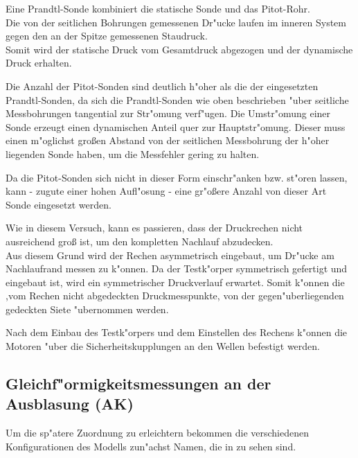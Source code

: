 Eine Prandtl-Sonde kombiniert die statische Sonde und das Pitot-Rohr.\\
Die von der seitlichen Bohrungen gemessenen Dr"ucke laufen im inneren System gegen den an der Spitze gemessenen Staudruck.\\
Somit wird der statische Druck vom Gesamtdruck abgezogen und der dynamische Druck erhalten.

Die Anzahl der Pitot-Sonden sind deutlich h"oher als die der eingesetzten Prandtl-Sonden, da sich die Prandtl-Sonden wie oben beschrieben "uber seitliche Messbohrungen tangential zur Str"omung verf"ugen. Die Umstr"omung einer Sonde erzeugt einen dynamischen Anteil quer zur Hauptstr"omung. Dieser muss einen m"oglichst gro\ss{}en Abstand von der seitlichen Messbohrung der h"oher liegenden Sonde haben, um die Messfehler gering zu halten.

Da die Pitot-Sonden sich nicht in dieser Form einschr"anken bzw. st"oren lassen, kann - zugute einer hohen Aufl"osung - eine gr"o\ss{}ere Anzahl von dieser Art Sonde eingesetzt werden.

Wie in diesem Versuch, kann es passieren, dass der Druckrechen nicht ausreichend gro\ss{} ist, um den kompletten Nachlauf abzudecken.\\
Aus diesem Grund wird der Rechen asymmetrisch eingebaut, um Dr"ucke am Nachlaufrand messen zu k"onnen. Da der Testk"orper symmetrisch gefertigt und eingebaut ist, wird ein symmetrischer Druckverlauf erwartet. Somit k"onnen die ,vom Rechen nicht abgedeckten Druckmesspunkte, von der gegen"uberliegenden gedeckten Siete "ubernommen werden.

Nach dem Einbau des Testk"orpers und dem Einstellen des Rechens k"onnen die Motoren "uber die Sicherheitskupplungen an den Wellen befestigt werden.


\subsection{Gleichf"ormigkeitsmessungen an der Ausblasung (AK)}
\label{s:Gleichf"ormigkeitsmessungen}
Um die sp"atere Zuordnung zu erleichtern bekommen die verschiedenen Konfigurationen des Modells zun"achst Namen, die in  zu sehen sind.

